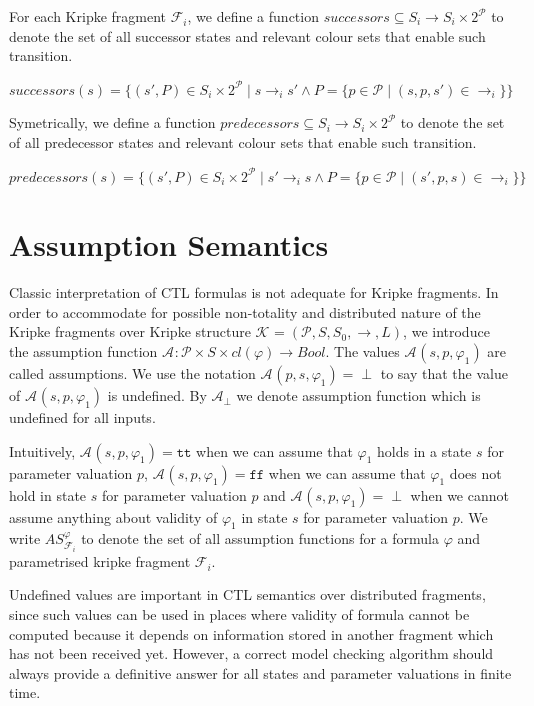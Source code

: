 \documentclass[12pt,oneside]{fithesis2}
\newcommand{\as}[1][]{\ensuremath{\mathcal{A}_{#1}}}
\newcommand{\asemt}{\as[\perp]}
\newcommand{\ASphi}{\ensuremath{AS_{\kf{i}{}}^\varphi}}
\newcommand{\true}{\ensuremath{\texttt{tt}}}
\newcommand{\false}{\ensuremath{\texttt{ff}}}
\newcommand{\ks}[1][]{\ensuremath{\mathcal{K}_{#1}}}
\newcommand{\kf}[2]{\ensuremath{\mathcal{F}^{#2}_{#1}}}
\newcommand{\fullKs}{\ensuremath{ \ks = (\params, S, S_0, \trans{}, L) }}
\newcommand{\trans}[1]{\stackrel{#1}{\rightarrow}}
\newcommand{\params}{\mathcal{P}}
\begin{document}
			For each Kripke fragment $\kf{i}{}$, we define a function $successors \subseteq S_{i} \rightarrow S_i \times 2^\params$ to denote the set of all successor states and relevant colour sets that enable such transition.
			
			\begin{center}
				$successors(s) = \{(s', P) \in S_i \times 2^\params \mid s \trans{}_i s' \wedge P = \{p \in \params \mid (s, p, s') \in \trans{}_{i} \}\} $
			\end{center}
			
			Symetrically, we define a function $predecessors \subseteq S_{i} \rightarrow S_i \times 2^\params$ to denote the set of all predecessor states and relevant colour sets that enable such transition.
			
			\begin{center}
				$predecessors(s) = \{(s', P) \in S_i \times 2^\params \mid s' \trans{}_i s \wedge P = \{p \in \params \mid (s', p, s) \in \trans{}_{i} \}\} $
			\end{center}						
			
		\section{Assumption Semantics}
		
			Classic interpretation of CTL formulas is not adequate for Kripke fragments. In order to accommodate for possible non-totality and distributed nature of the Kripke fragments over Kripke structure $\fullKs$, we introduce the assumption function $\as : \params \times S \times cl(\varphi) \rightarrow Bool $. The values $\as(s, p, \varphi_1)$ are called assumptions. We use the notation $\as(p, s, \varphi_1) = \perp $ to say that the value of $\as(s, p, \varphi_1)$ is undefined. By $\asemt$ we denote assumption function which is undefined for all inputs.
			
			Intuitively, $\as(s, p, \varphi_1) = \true$ when we can assume that $\varphi_1$ holds in a state $s$ for parameter valuation $p$, $\as(s, p, \varphi_1) = \false$ when we can assume that $\varphi_1$ does not hold in state $s$ for parameter valuation $p$ and $\as(s, p, \varphi_1) = \perp$ when we cannot assume anything about validity of $\varphi_1$ in state $s$ for parameter valuation $p$. We write $\ASphi$ to denote the set of all assumption functions for a formula $\varphi$ and parametrised kripke fragment $\kf{i}{}$.
			
			Undefined values are important in CTL semantics over distributed fragments, since such values can be used in places where validity of formula cannot be computed because it depends on information stored in another fragment which has not been received yet. However, a correct model checking algorithm should always provide a definitive answer for all states and parameter valuations in finite time.
			
\end{document}
